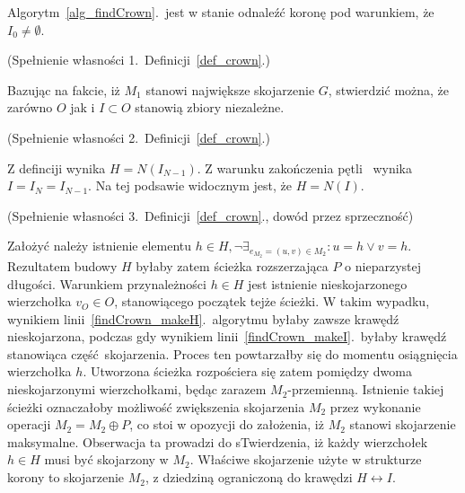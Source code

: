\begin{theorem}
  Algorytm~\ref{alg_findCrown}.\ jest w stanie odnaleźć koronę pod warunkiem, że
  $I_0\neq\emptyset$.
\end{theorem}
\begin{bproof} (Spełnienie własności 1.\ Definicji~\ref{def_crown}.)
  \par{
    Bazując na fakcie, iż $M_1$ stanowi największe skojarzenie $G$, stwierdzić
    można, że zarówno $O$ jak i $I \subset O$ stanowią zbiory niezależne.
  }
\end{bproof}
\begin{bproof} (Spełnienie własności 2.\ Definicji~\ref{def_crown}.)
  \par{
    Z definciji wynika $H=N(I_{N-1})$.
    Z warunku zakończenia pętli~ wynika 
    $I=I_N=I_{N-1}$.
    Na tej podsawie widocznym jest, że $H=N(I)$.
  }
\end{bproof}
\begin{bproof} (Spełnienie własności 3.\ Definicji~\ref{def_crown}., dowód przez
  sprzeczność)\par{
    Założyć należy istnienie elementu $h \in H, \neg\exists_{e_{M_2}=(u,v) \in
  M_2}: u=h \lor v = h$.
  Rezultatem budowy $H$ byłaby zatem ścieżka rozszerzająca $P$ o nieparzystej
  długości. 
  Warunkiem przynależności $h \in H$ jest istnienie nieskojarzonego wierzchołka
  $v_O \in O$, stanowiącego początek tejże ścieżki.
  W takim wypadku, wynikiem linii~\ref{findCrown_makeH}.\ algorytmu byłaby
  zawsze krawędź nieskojarzona, podczas gdy wynikiem
  linii~\ref{findCrown_makeI}.\ byłaby  krawędź stanowiąca część~skojarzenia.
  Proces ten powtarzałby się do momentu osiągnięcia wierzchołka $h$.
  Utworzona ścieżka rozpościera się zatem pomiędzy dwoma nieskojarzonymi
  wierzchołkami, będąc zarazem $M_2$-przemienną.
  Istnienie takiej ścieżki oznaczałoby możliwość zwiększenia skojarzenia $M_2$
  przez wykonanie operacji $M_2=M_2\oplus P$, co stoi w opozycji do
  założenia, iż $M_2$ stanowi skojarzenie maksymalne.
  Obserwacja ta prowadzi do sTwierdzenia, iż każdy wierzchołek $h \in H$ musi
  być skojarzony w $M_2$.
  Właściwe skojarzenie użyte w strukturze korony to skojarzenie $M_2$, z
  dziedziną ograniczoną do krawędzi $H \leftrightarrow I$.
}
\end{bproof}

